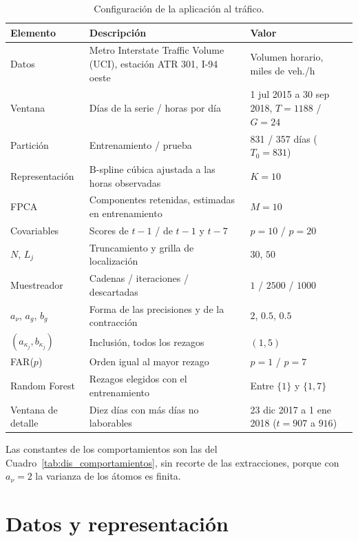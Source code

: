 \begin{table}[H]
\centering\small
\caption{Configuración de la aplicación al tráfico.}
\label{tab:aneC_configuracion}
\begin{tabular}{p{} p{} p{}}
\hline
Elemento & Descripción & Valor \\
\hline
Datos & Metro Interstate Traffic Volume (UCI), estación ATR 301, I-94 oeste & Volumen horario, miles de veh./h \\
Ventana & Días de la serie / horas por día & 1 jul 2015 a 30 sep 2018, $T = 1188$ / $G = 24$ \\
Partición & Entrenamiento / prueba & 831 / 357 días ($T_0 = 831$) \\
Representación & B-spline cúbica ajustada a las horas observadas & $K = 10$ \\
FPCA & Componentes retenidas, estimadas en entrenamiento & $M = 10$ \\
Covariables & Scores de $t-1$ / de $t-1$ y $t-7$ & $p = 10$ / $p = 20$ \\
$N$, $L_j$ & Truncamiento y grilla de localización & $30$, $50$ \\
Muestreador & Cadenas / iteraciones / descartadas & $1$ / $2500$ / $1000$ \\
$a_\nu$, $a_g$, $b_g$ & Forma de las precisiones y de la contracción & $2$, $0.5$, $0.5$ \\
$(a_{\kappa_j}, b_{\kappa_j})$ & Inclusión, todos los rezagos & $(1, 5)$ \\
FAR($p$) & Orden igual al mayor rezago & $p = 1$ / $p = 7$ \\
Random Forest & Rezagos elegidos con el entrenamiento & Entre $\{1\}$ y $\{1,7\}$ \\
Ventana de detalle & Diez días con más días no laborables & 23 dic 2017 a 1 ene 2018 ($t = 907$ a $916$) \\
\hline
\end{tabular}
\end{table}

Las constantes de los comportamientos son las del Cuadro~\ref{tab:dis_comportamientos}, sin recorte de las extracciones, porque con $a_\nu = 2$ la varianza de los átomos es finita.

\section{Datos y representación}
\label{aneC_00_02_datos}

